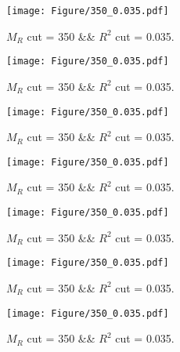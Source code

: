  
\begin{figure}[H] 
\begin{center} 
\texttt{[image: Figure/350\_0.035.pdf]} 
\caption{$M_R$ cut = 350 \&\& $R^2$ cut = 0.035.} 
\label{Fig:350_0.035} 
\end{center} 
\end{figure} 
 
 
\begin{figure}[H] 
\begin{center} 
\texttt{[image: Figure/350\_0.035.pdf]} 
\caption{$M_R$ cut = 350 \&\& $R^2$ cut = 0.035.} 
\label{Fig:350_0.035} 
\end{center} 
\end{figure} 
 
 
\begin{figure}[H] 
\begin{center} 
\texttt{[image: Figure/350\_0.035.pdf]} 
\caption{$M_R$ cut = 350 \&\& $R^2$ cut = 0.035.} 
\label{Fig:350_0.035} 
\end{center} 
\end{figure} 
 
 
\begin{figure}[H] 
\begin{center} 
\texttt{[image: Figure/350\_0.035.pdf]} 
\caption{$M_R$ cut = 350 \&\& $R^2$ cut = 0.035.} 
\label{Fig:350_0.035} 
\end{center} 
\end{figure} 
 
 
\begin{figure}[H] 
\begin{center} 
\texttt{[image: Figure/350\_0.035.pdf]} 
\caption{$M_R$ cut = 350 \&\& $R^2$ cut = 0.035.} 
\label{Fig:350_0.035} 
\end{center} 
\end{figure} 
 
 
\begin{figure}[H] 
\begin{center} 
\texttt{[image: Figure/350\_0.035.pdf]} 
\caption{$M_R$ cut = 350 \&\& $R^2$ cut = 0.035.} 
\label{Fig:350_0.035} 
\end{center} 
\end{figure} 
 
 
\begin{figure}[H] 
\begin{center} 
\texttt{[image: Figure/350\_0.035.pdf]} 
\caption{$M_R$ cut = 350 \&\& $R^2$ cut = 0.035.} 
\label{Fig:350_0.035} 
\end{center} 
\end{figure} 
 
